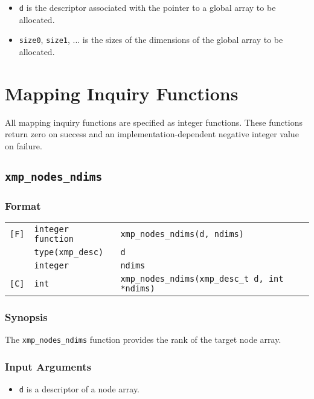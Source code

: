 \begin{itemize}
 \item {\tt d} is the descriptor associated with the pointer to a global
	   array to be allocated.
 \item {\tt size0}, {\tt size1}, ... is the sizes of the dimensions of
	   the global array to be allocated.
\end{itemize}


\section{Mapping Inquiry Functions}

All mapping inquiry functions are specified as integer functions.
These functions return zero on success and an implementation-dependent
negative integer value on failure.

\subsection{\tt xmp\_nodes\_ndims}

\subsubsection*{Format}

\begin{tabular}{lll}

\verb![F]!& {\tt integer function}& {\tt xmp\_nodes\_ndims(d, ndims)}\\
          & {\tt type(xmp\_desc)} & {\tt d}\\
          & {\tt integer} & {\tt ndims}\\

\verb![C]!&  {\tt int}& {\tt xmp\_nodes\_ndims(xmp\_desc\_t d, int *ndims)}\\

\end{tabular}

\subsubsection*{Synopsis}

The {\tt xmp\_nodes\_ndims} function provides the rank of the target node
array.

\subsubsection*{Input Arguments}
\begin{itemize}
 \item {\tt d} is a descriptor of a node array.
\end{itemize}

